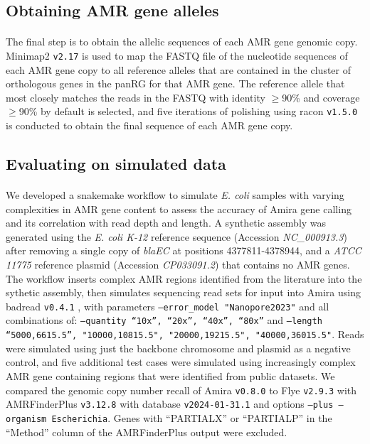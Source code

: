 \subsection*{Obtaining AMR gene alleles}
\paragraph{}
The final step is to obtain the allelic sequences of each AMR gene genomic copy. Minimap2 \texttt{v2.17} \cite{10.1093/bioinformatics/bty191} is used to map the FASTQ file of the nucleotide sequences of each AMR gene copy to all reference alleles that are contained in the cluster of orthologous genes in the panRG for that AMR gene. The reference allele that most closely matches the reads in the FASTQ with identity $\ge$90\% and coverage $\ge$90\% by default is selected, and five iterations of polishing using racon \texttt{v1.5.0} \cite{10.1101/gr.214270.116} is conducted to obtain the final sequence of each AMR gene copy.

\subsection*{Evaluating on simulated data}
\paragraph{}
We developed a snakemake \cite{10.1093/bioinformatics/bts480} workflow to simulate \textit{E. coli} samples with varying complexities in AMR gene content to assess the accuracy of Amira gene calling and its correlation with read depth and length. A synthetic assembly was generated using the \textit{E. coli K-12} reference sequence (Accession \textit{NC\_000913.3}) after removing a single copy of \textit{blaEC} at positions 4377811-4378944, and a \textit{ATCC 11775} reference plasmid (Accession \textit{CP033091.2}) that contains no AMR genes. The workflow inserts complex AMR regions identified from the literature into the sythetic assembly, then simulates sequencing read sets for input into Amira using badread \texttt{v0.4.1} \cite{Wick2019}, with parameters \texttt{--error\_model "Nanopore2023"} and all combinations of: \texttt{--quantity “10x”, “20x”, “40x”, “80x”} and \texttt{--length “5000,6615.5”, "10000,10815.5", "20000,19215.5", "40000,36015.5"}. Reads were simulated using just the backbone chromosome and plasmid as a negative control, and five additional test cases were simulated using increasingly complex AMR gene containing regions that were identified from public datasets. We compared the genomic copy number recall of Amira \texttt{v0.8.0} to Flye \texttt{v2.9.3} with AMRFinderPlus \texttt{v3.12.8} \cite{Feldgarden2021} with database \texttt{v2024-01-31.1} and options \texttt{--plus --organism Escherichia}. Genes with “PARTIALX” or “PARTIALP” in the “Method” column of the AMRFinderPlus output were excluded.

